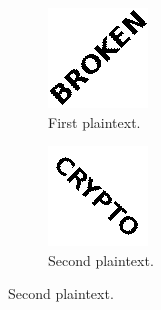 \documentclass[11pt,ebook,table,dvipsnames]{memoir}
\begin{document}
\begin{figure}[p]
  \centering
  \begin{subfigure}[b]{.4\textwidth}
    \includegraphics[width=\textwidth,frame]{./Illustrations/KeyReuse/Broken.png}
    \caption{First plaintext.}
  \end{subfigure}
  \begin{subfigure}[b]{.4\textwidth}
    \includegraphics[width=\textwidth,frame]{./Illustrations/KeyReuse/Crypto.png}
    \caption{Second plaintext.}
  \end{subfigure}


\end{figure}
\end{document}

